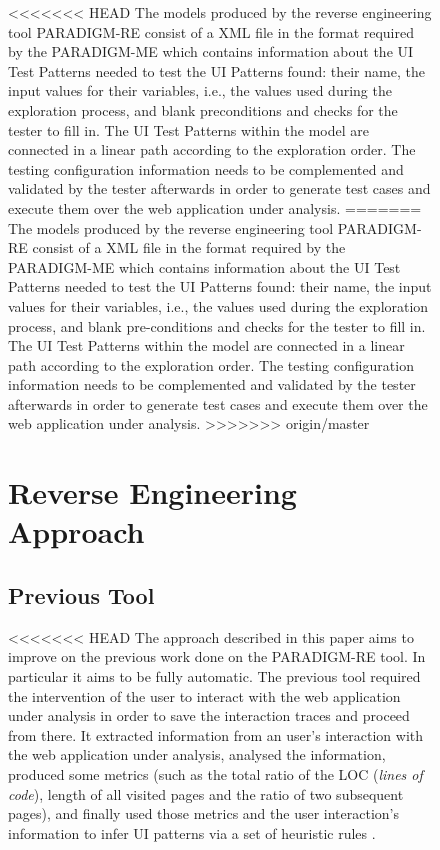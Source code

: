 \documentclass[conference]{IEEEtran}
\begin{document}
\begin{enumerate}
\begin{figure}[!htb]
\begin{itemize}
<<<<<<< HEAD
The models produced by the reverse engineering tool PARADIGM-RE consist of a XML file in the format required by the PARADIGM-ME which contains information about the UI Test Patterns needed to test the UI Patterns found: their name, the input values for their variables, i.e., the values used during the exploration process, and blank preconditions and checks for the tester to fill in. The UI Test Patterns within the model are connected in a linear path according to the exploration order. The testing configuration information needs to be complemented and validated by the tester afterwards in order to generate test cases and execute them over the web application under analysis.
=======
The models produced by the reverse engineering tool PARADIGM-RE consist of a XML file in the format required by the PARADIGM-ME which contains information about the UI Test Patterns needed to test the UI Patterns found: their name, the input values for their variables, i.e., the values used during the exploration process, and blank pre-conditions and checks for the tester to fill in. The UI Test Patterns within the model are connected in a linear path according to the exploration order. The testing configuration information needs to be complemented and validated by the tester afterwards in order to generate test cases and execute them over the web application under analysis.
>>>>>>> origin/master

\section{Reverse Engineering Approach}\label{sec:re}

\subsection{Previous Tool}\label{sec:prev}

<<<<<<< HEAD
The  approach described in this paper aims to improve on the previous work \cite{nabuco2013inferring} done on the PARADIGM-RE tool. In particular it aims to be fully automatic. The previous tool required the intervention of the user to interact with the web application under analysis in order to save the interaction traces and proceed from there. It extracted information from an user's interaction with the web application under analysis, analysed the information, produced some metrics (such as the total ratio of the LOC (\textit{lines of code}), length of all visited pages and the ratio of two subsequent pages), and finally used those metrics and the user interaction's information to infer UI patterns via a set of heuristic rules \cite{nabuco2013inferring}. 


\end{itemize}
\end{figure}
\end{enumerate}
\end{document}
